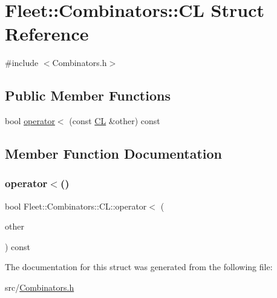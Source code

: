 \hypertarget{struct_fleet_1_1_combinators_1_1_c_l}{}\section{Fleet\+:\+:Combinators\+:\+:CL Struct Reference}
\label{struct_fleet_1_1_combinators_1_1_c_l}


{\ttfamily \#include $<$Combinators.\+h$>$}

\subsection*{Public Member Functions}
\begin{DoxyCompactItemize}
\item 
bool \hyperlink{struct_fleet_1_1_combinators_1_1_c_l_af9af3d9be95e109d9f657b5e1bbfd3c4}{operator$<$} (const \hyperlink{struct_fleet_1_1_combinators_1_1_c_l}{CL} \&other) const
\end{DoxyCompactItemize}


\subsection{Member Function Documentation}
\mbox{\label{struct_fleet_1_1_combinators_1_1_c_l_af9af3d9be95e109d9f657b5e1bbfd3c4}} 
\subsubsection{\texorpdfstring{operator$<$()}{operator<()}}
{\footnotesize\ttfamily bool Fleet\+::\+Combinators\+::\+C\+L\+::operator$<$ (\begin{DoxyParamCaption}\item[{const \hyperlink{struct_fleet_1_1_combinators_1_1_c_l}{CL} \&}]{other }\end{DoxyParamCaption}) const\hspace{0.3cm}{\ttfamily [inline]}}



The documentation for this struct was generated from the following file\+:\begin{DoxyCompactItemize}
\item 
src/\hyperlink{_combinators_8h}{Combinators.\+h}\end{DoxyCompactItemize}
